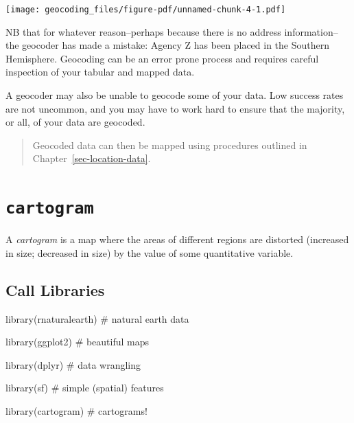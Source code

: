 \documentclass[
  letterpaper,
  DIV=11,
  numbers=noendperiod,
  oneside]{scrreprt}
\newenvironment{Shaded}{\begin{snugshade}}{\end{snugshade}}
\newcommand{\CommentTok}[1]{\textcolor[rgb]{0.37,0.37,0.37}{#1}}
\newcommand{\FunctionTok}[1]{\textcolor[rgb]{0.28,0.35,0.67}{#1}}
\newcommand{\NormalTok}[1]{\textcolor[rgb]{0.00,0.23,0.31}{#1}}
\begin{document}
\texttt{[image: geocoding\_files/figure-pdf/unnamed-chunk-4-1.pdf]}

\begin{tcolorbox}[enhanced jigsaw, coltitle=black, breakable, leftrule=.75mm, opacityback=0, colback=white, bottomtitle=1mm, left=2mm, toptitle=1mm, toprule=.15mm, opacitybacktitle=0.6, rightrule=.15mm, titlerule=0mm, colframe=quarto-callout-important-color-frame, bottomrule=.15mm, title=\textcolor{quarto-callout-important-color}{\faExclamation}\hspace{0.5em}{Geocoding Can Make Errors!}, colbacktitle=quarto-callout-important-color!10!white, arc=.35mm]

NB that for whatever reason--perhaps because there is no address
information--the geocoder has made a mistake: Agency Z has been placed
in the Southern Hemisphere. Geocoding can be an error prone process and
requires careful inspection of your tabular and mapped data.

A geocoder may also be unable to geocode some of your data. Low success
rates are not uncommon, and you may have to work hard to ensure that the
majority, or all, of your data are geocoded.

\end{tcolorbox}

\begin{quote}
Geocoded data can then be mapped using procedures outlined in
Chapter~\ref{sec-location-data}.
\end{quote}

\chapter{\texorpdfstring{\texttt{cartogram}}{cartogram}}\label{cartogram}

A \emph{cartogram} is a map where the areas of different regions are
distorted (increased in size; decreased in size) by the value of some
quantitative variable.

\section{Call Libraries}\label{call-libraries-7}

\begin{Shaded}
\begin{Highlighting}[]
\FunctionTok{library}\NormalTok{(rnaturalearth) }\CommentTok{\# natural earth data}

\FunctionTok{library}\NormalTok{(ggplot2) }\CommentTok{\# beautiful maps}

\FunctionTok{library}\NormalTok{(dplyr) }\CommentTok{\# data wrangling}

\FunctionTok{library}\NormalTok{(sf) }\CommentTok{\# simple (spatial) features}

\FunctionTok{library}\NormalTok{(cartogram) }\CommentTok{\# cartograms!}
\end{Highlighting}
\end{Shaded}
\end{document}
